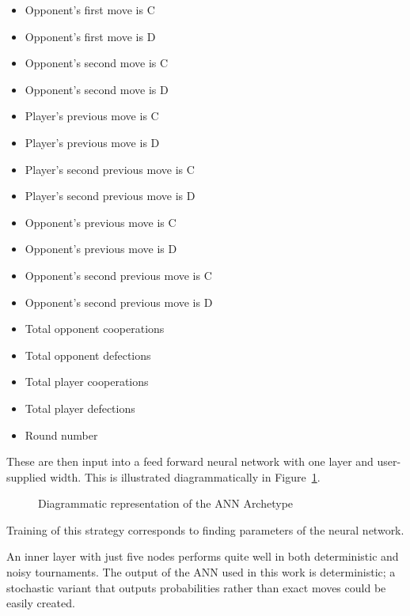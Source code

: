 \documentclass{article}
\begin{document}
\begin{multicols}{2}
    \begin{itemize}
        \item Opponent's first move is C
        \item Opponent's first move is D
        \item Opponent's second move is C
        \item Opponent's second move is D
        \item Player's previous move is C
        \item Player's previous move is D
        \item Player's second previous move is C
        \item Player's second previous move is D
        \item Opponent's previous move is C
        \item Opponent's previous move is D
        \item Opponent's second previous move is C
        \item Opponent's second previous move is D
        \item Total opponent cooperations
        \item Total opponent defections
        \item Total player cooperations
        \item Total player defections
        \item Round number
    \end{itemize}
\end{multicols}

These are then input into a feed forward neural network with one layer and
user-supplied width.  This is illustrated diagrammatically in
Figure~\ref{fig:ann}.

\begin{figure}[!hbtp]
    \centering
    
    \caption{Diagrammatic representation of the ANN Archetype}
    \label{fig:ann}
\end{figure}

Training of this strategy corresponds to finding parameters of the neural
network.

An inner layer with just five nodes performs quite well in both deterministic and
noisy tournaments. The output of the ANN used in this work is deterministic;
a stochastic variant that outputs probabilities rather than exact moves could
be easily created.
\end{document}
